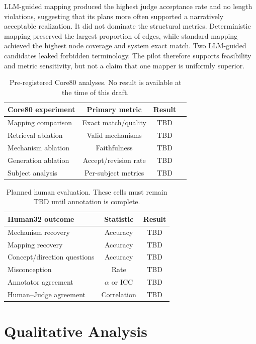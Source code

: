 \documentclass[letterpaper]{article} %
\begin{document}
LLM-guided mapping produced the highest judge acceptance rate and no length violations, suggesting that its plans more often supported a narratively acceptable realization. It did not dominate the structural metrics. Deterministic mapping preserved the largest proportion of edges, while standard mapping achieved the highest node coverage and system exact match. Two LLM-guided candidates leaked forbidden terminology. The pilot therefore supports feasibility and metric sensitivity, but not a claim that one mapper is uniformly superior.

\begin{table}[t]
\centering
\small
\begin{tabular}{lccc}
\toprule
Core80 experiment & Primary metric & Result \\
\midrule
Mapping comparison & Exact match/quality & TBD \\
Retrieval ablation & Valid mechanisms & TBD \\
Mechanism ablation & Faithfulness & TBD \\
Generation ablation & Accept/revision rate & TBD \\
Subject analysis & Per-subject metrics & TBD \\
\bottomrule
\end{tabular}
\caption{Pre-registered Core80 analyses. No result is available at the time of this draft.}
\label{tab:tbd-core}
\end{table}

\begin{table}[t]
\centering
\small
\begin{tabular}{lcc}
\toprule
Human32 outcome & Statistic & Result \\
\midrule
Mechanism recovery & Accuracy & TBD \\
Mapping recovery & Accuracy & TBD \\
Concept/direction questions & Accuracy & TBD \\
Misconception & Rate & TBD \\
Annotator agreement & $\alpha$ or ICC & TBD \\
Human--Judge agreement & Correlation & TBD \\
\bottomrule
\end{tabular}
\caption{Planned human evaluation. These cells must remain TBD until annotation is complete.}
\label{tab:tbd-human}
\end{table}

\section{Qualitative Analysis}
\end{document}
